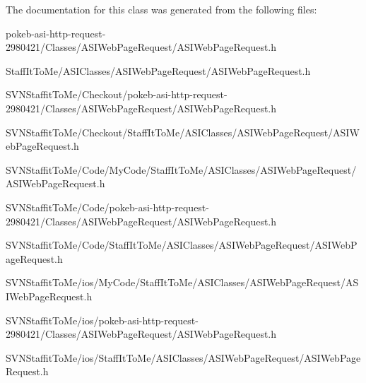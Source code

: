 \-The documentation for this class was generated from the following files\-:\begin{DoxyCompactItemize}
\item 
pokeb-\/asi-\/http-\/request-\/2980421/\-Classes/\-A\-S\-I\-Web\-Page\-Request/\-A\-S\-I\-Web\-Page\-Request.\-h\item 
\-Staff\-It\-To\-Me/\-A\-S\-I\-Classes/\-A\-S\-I\-Web\-Page\-Request/\-A\-S\-I\-Web\-Page\-Request.\-h\item 
\-S\-V\-N\-Staffit\-To\-Me/\-Checkout/pokeb-\/asi-\/http-\/request-\/2980421/\-Classes/\-A\-S\-I\-Web\-Page\-Request/\-A\-S\-I\-Web\-Page\-Request.\-h\item 
\-S\-V\-N\-Staffit\-To\-Me/\-Checkout/\-Staff\-It\-To\-Me/\-A\-S\-I\-Classes/\-A\-S\-I\-Web\-Page\-Request/\-A\-S\-I\-Web\-Page\-Request.\-h\item 
\-S\-V\-N\-Staffit\-To\-Me/\-Code/\-My\-Code/\-Staff\-It\-To\-Me/\-A\-S\-I\-Classes/\-A\-S\-I\-Web\-Page\-Request/\-A\-S\-I\-Web\-Page\-Request.\-h\item 
\-S\-V\-N\-Staffit\-To\-Me/\-Code/pokeb-\/asi-\/http-\/request-\/2980421/\-Classes/\-A\-S\-I\-Web\-Page\-Request/\-A\-S\-I\-Web\-Page\-Request.\-h\item 
\-S\-V\-N\-Staffit\-To\-Me/\-Code/\-Staff\-It\-To\-Me/\-A\-S\-I\-Classes/\-A\-S\-I\-Web\-Page\-Request/\-A\-S\-I\-Web\-Page\-Request.\-h\item 
\-S\-V\-N\-Staffit\-To\-Me/ios/\-My\-Code/\-Staff\-It\-To\-Me/\-A\-S\-I\-Classes/\-A\-S\-I\-Web\-Page\-Request/\-A\-S\-I\-Web\-Page\-Request.\-h\item 
\-S\-V\-N\-Staffit\-To\-Me/ios/pokeb-\/asi-\/http-\/request-\/2980421/\-Classes/\-A\-S\-I\-Web\-Page\-Request/\-A\-S\-I\-Web\-Page\-Request.\-h\item 
\-S\-V\-N\-Staffit\-To\-Me/ios/\-Staff\-It\-To\-Me/\-A\-S\-I\-Classes/\-A\-S\-I\-Web\-Page\-Request/\-A\-S\-I\-Web\-Page\-Request.\-h\end{DoxyCompactItemize}

